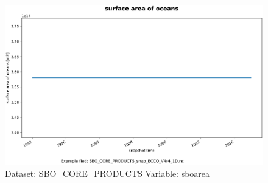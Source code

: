 \begin{figure}[H]
\centering
\includegraphics[scale=0.55]{../images/plots/oneD_plots/SBO_Core_Products/sboarea.png}
\caption{Dataset: SBO\_CORE\_PRODUCTS Variable: sboarea}
\label{tab:table-SBO_CORE_PRODUCTS_sboarea-Plot}
\end{figure}
\pagebreak
